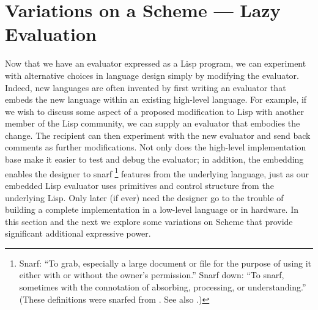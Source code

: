 \section{Variations on a Scheme --- Lazy Evaluation}
\label{Section 4.2}

Now that we have an evaluator expressed as a Lisp program, we can experiment with alternative choices in language design simply by modifying the evaluator.
Indeed, new languages are often invented by first writing an evaluator that embeds the new language within an existing high-level language.
For example, if we wish to discuss some aspect of a proposed modification to Lisp with another member of the Lisp community, we can supply an evaluator that embodies the change.
The recipient can then experiment with the new evaluator and send back comments as further modifications.
Not only does the high-level implementation base make it easier to test and debug the evaluator;
in addition, the embedding enables the designer to snarf%
\footnote{
	Snarf:
	“To grab, especially a large document or file for the purpose of using it either with or without the owner’s permission.”
	Snarf down:
	“To snarf, sometimes with the connotation of absorbing, processing, or understanding.”
	(These definitions were snarfed from .
	See also .)
}
features from the underlying language, just as our embedded Lisp evaluator uses primitives and control structure from the underlying Lisp.
Only later (if ever) need the designer go to the trouble of building a complete implementation in a low-level language or in hardware.
In this section and the next we explore some variations on Scheme that provide significant additional expressive power.




